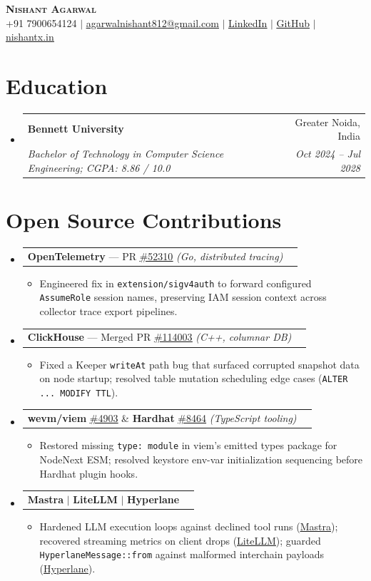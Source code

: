 \documentclass[letterpaper,11pt]{article}
\makeatletter
\newcommand{\resumeItem}[1]{
  \item\small{
    {#1 \vspace{-5pt}}
  }
}
\newcommand{\resumeSubheading}[4]{
  \vspace{-2pt}\item
    \begin{tabular*}{0.97\textwidth}[t]{l@{\extracolsep{\fill}}r}
      \textbf{#1} & #2 \\
      \textit{\small#3} & \textit{\small #4} \\
    \end{tabular*}\vspace{-9pt}
}
\newcommand{\resumeProjectHeading}[2]{
  \item
    \begin{tabular*}{0.97\textwidth}{l@{\extracolsep{\fill}}r}
      \small#1 & #2 \\
    \end{tabular*}\vspace{-9pt}
}
\newcommand{\resumeSubHeadingListStart}{\begin{itemize}[leftmargin=0.15in, label={}]}
\newcommand{\resumeSubHeadingListEnd}{\end{itemize}}
\newcommand{\resumeItemListStart}{\begin{itemize}}
\newcommand{\resumeItemListEnd}{\end{itemize}\vspace{-10pt}}
\makeatother
\begin{document}
\begin{center}
  \textbf{\Huge \scshape Nishant Agarwal} \\ \vspace{1pt}
  \small +91 7900654124 $|$
  \href{mailto:agarwalnishant812@gmail.com}{\underline{agarwalnishant812@gmail.com}} $|$
  \href{https://www.linkedin.com/in/nishant-agarwal-62a956322/}{\underline{LinkedIn}} $|$
  \href{https://github.com/nishant-uxs}{\underline{GitHub}} $|$
  \href{https://nishantx.in}{\underline{nishantx.in}}
\end{center}

\section{Education}
  \resumeSubHeadingListStart
    \resumeSubheading
      {Bennett University}{Greater Noida, India}
      {Bachelor of Technology in Computer Science Engineering; CGPA: 8.86 / 10.0}{Oct 2024 -- Jul 2028}
  \resumeSubHeadingListEnd

\section{Open Source Contributions}
  \resumeSubHeadingListStart
    \resumeProjectHeading
      {\textbf{OpenTelemetry} --- PR \href{https://github.com/open-telemetry/opentelemetry-collector-contrib/pull/52310}{\underline{\#52310}} \emph{(Go, distributed tracing)}}{}
      \resumeItemListStart
        \resumeItem{Engineered fix in \texttt{extension/sigv4auth} to forward configured \texttt{AssumeRole} session names, preserving IAM session context across collector trace export pipelines.}
      \resumeItemListEnd
    \resumeProjectHeading
      {\textbf{ClickHouse} --- Merged PR \href{https://github.com/ClickHouse/ClickHouse/pull/114003}{\underline{\#114003}} \emph{(C++, columnar DB)}}{}
      \resumeItemListStart
        \resumeItem{Fixed a Keeper \texttt{writeAt} path bug that surfaced corrupted snapshot data on node startup; resolved table mutation scheduling edge cases (\texttt{ALTER ... MODIFY TTL}).}
      \resumeItemListEnd
    \resumeProjectHeading
      {\textbf{wevm/viem} \href{https://github.com/wevm/viem/pull/4903}{\underline{\#4903}} \& \textbf{Hardhat} \href{https://github.com/NomicFoundation/hardhat/pull/8464}{\underline{\#8464}} \emph{(TypeScript tooling)}}{}
      \resumeItemListStart
        \resumeItem{Restored missing \texttt{type: module} in viem's emitted types package for NodeNext ESM; resolved keystore env-var initialization sequencing before Hardhat plugin hooks.}
      \resumeItemListEnd
    \resumeProjectHeading
      {\textbf{Mastra} $|$ \textbf{LiteLLM} $|$ \textbf{Hyperlane}}{}
      \resumeItemListStart
        \resumeItem{Hardened LLM execution loops against declined tool runs (\href{https://github.com/mastra-ai/mastra/pull/20487}{\underline{Mastra}}); recovered streaming metrics on client drops (\href{https://github.com/BerriAI/litellm/pull/35349}{\underline{LiteLLM}}); guarded \texttt{HyperlaneMessage::from} against malformed interchain payloads (\href{https://github.com/hyperlane-xyz/hyperlane-monorepo/pull/9181}{\underline{Hyperlane}}).}
      \resumeItemListEnd
  \resumeSubHeadingListEnd
\end{document}
